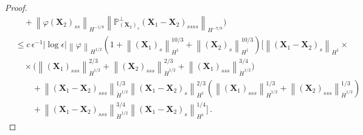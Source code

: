 \documentclass[11pt,reqno]{amsart}
\renewcommand{\P}{\mathbb{P}}
\newcommand{\X}{\bm{X}}
\newcommand{\abs}[1]{\left\lvert #1 \right\rvert}
\newcommand{\norm}[1]{\left\lVert #1 \right\rVert}
\numberwithin{equation}{section}
\theoremstyle{definition}
\begin{document}
\begin{proof}
\begin{equation}
\begin{aligned}
  &\quad + \norm{\varphi(\X_2)_{ss}}_{H^{-1/8}} \norm{\P_{(\X_2)_s}^\perp(\X_1-\X_2)_{ssss}}_{H^{-7/8}}\bigg) \\
   &\le c\,\epsilon^{-1}\abs{\log\epsilon}\norm{\varphi}_{H^{1/2}}(1+\norm{(\X_1)_s}_{H^1}^{10/3}+\norm{(\X_2)_s}_{H^1}^{10/3})\bigg[\norm{(\X_1-\X_2)_s}_{H^1}\times\\
  &\quad\times\bigg(\norm{(\X_1)_{sss}}_{\dot H^{1/2}}^{2/3} + \norm{(\X_2)_{sss}}_{\dot H^{1/2}}^{2/3} + \norm{(\X_1)_{sss}}_{\dot H^{1/2}}^{3/4}\bigg) \\
  &\qquad + \norm{(\X_1-\X_2)_{sss}}_{\dot H^{1/2}}^{1/3}\norm{(\X_1-\X_2)_s}_{H^1}^{2/3}(\norm{(\X_1)_{sss}}_{\dot H^{1/2}}^{1/3}+\norm{(\X_2)_{sss}}_{\dot H^{1/2}}^{1/3}) \\
  &\qquad  + \norm{(\X_1-\X_2)_{sss}}_{\dot H^{1/2}}^{3/4}\norm{(\X_1-\X_2)_s}_{H^1}^{1/4} \bigg]\,.
\end{aligned}
\end{equation}



\end{proof}
\end{document}
